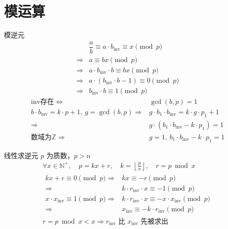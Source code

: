 \section{模运算}

	\begin{lecture}{模逆元}
		\[
		\begin{aligned}
			& \dfrac{a}{b} \equiv a \cdot b_{\mathrm{inv}} \equiv x \pmod p\\
			\Rightarrow & a \equiv bx \pmod p\\
			\Rightarrow & a \cdot b_{\mathrm{inv}} \cdot b \equiv bx \pmod p\\
			\Rightarrow & a \cdot (b_{\mathrm{inv}} \cdot b - 1) \equiv 0 \pmod p\\
			\Rightarrow & b_{\mathrm{inv}} \cdot b \equiv 1 \pmod p
		\end{aligned}
		\]
		\[
		\begin{aligned}
			\mathrm{inv} \text{存在} \Leftrightarrow & \gcd(b,p) = 1\\
			b \cdot b_{\mathrm{inv}} = k \cdot p + 1,\ g = \gcd(b,p) 
			\Rightarrow & 
			g \cdot b_1 \cdot b_{\mathrm{inv}} 
			= k \cdot g \cdot p_1 + 1\\
			\Rightarrow & 
			g \cdot (b_1 \cdot b_{\mathrm{inv}} - k \cdot p_1) = 1\\
			\text{数域为} \mathbb{Z} 
			\Rightarrow & 
			g = 1,\ b_1 \cdot b_{\mathrm{inv}} - k \cdot p_1 = 1
		\end{aligned}
		\]
	\end{lecture}

	\begin{lecture}{线性求逆元}
		$p$ 为质数，$p > n$
		\[
		\begin{array}{c}
		\forall x \in \mathbb{N}^+,\quad
		p = kx + r,\quad
		k = \left\lfloor \frac{p}{x} \right\rfloor,\quad
		r = p \bmod x
		\\[6pt]
		\begin{array}{rl}
		kx + r \equiv 0 \pmod p
		\Rightarrow & kx \equiv -r \pmod p
		\\
		\Rightarrow & k \cdot r_{\mathrm{inv}} \cdot x \equiv -1 \pmod p
		\\
		x \cdot x_{\mathrm{inv}} \equiv 1 \pmod p
		\Rightarrow & k \cdot r_{\mathrm{inv}} \cdot x \equiv -x \cdot x_{\mathrm{inv}} \pmod p
		\\
		\Rightarrow & x_{\mathrm{inv}} \equiv -k \cdot r_{\mathrm{inv}} \pmod p
		\end{array}
		\\[6pt]
		r = p \bmod x < x \Rightarrow r_{\mathrm{inv}} \text{ 比 } x_{\mathrm{inv}} \text{ 先被求出}
		\end{array}
		\]
	\end{lecture}

